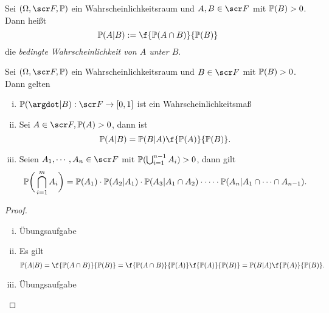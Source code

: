 \begin{df} \label{1.5.2}
	Sei $(\Omega, \scr F, \P)$ ein Wahrscheinlichkeitsraum und $A,B \in \scr F$ mit $\P(B) > 0$.
	Dann heißt
	\[
		\P(A | B) := \f {\P(A\cap B)}{\P(B)}
	\]
	die \emph{bedingte Wahrscheinlichkeit von $A$ unter $B$}.
\end{df}


\begin{st} \label{1.5.3}
	Sei $(\Omega, \scr F, \P)$ ein Wahrscheinlichkeitsraum und $B \in \scr F$ mit $\P(B) > 0$.
	Dann gelten
	\begin{enumerate}[(i)]
		\item
			$\P(\argdot | B) : \scr F \to [0,1]$ ist ein Wahrscheinlichkeitsmaß
		\item
			Sei $A \in \scr F, \P(A) > 0$, dann ist
			\[
				\P(A|B) = \P(B|A) \f {\P(A)}{\P(B)}.
			\]
		\item
			Seien $A_1, \cdots, A_n \in \scr F$ mit $\P(\bigcup_{i=1}^{n-1} A_i) > 0$, dann gilt
			\[
				\P\bigg(\bigcap_{i=1}^m A_i\bigg)
				= \P(A_1) \cdot \P(A_2|A_1) \cdot \P(A_3|A_1\cap A_2) \cdot \dotsb \cdot \P(A_n|A_1 \cap \dotsb \cap A_{n-1}).
			\]
	\end{enumerate}
	\begin{proof}
		\begin{enumerate}[(i)]
			\item
				Übungsaufgabe %
			\item
				Es gilt
				\[
					\P(A|B)
					= \f{\P(A\cap B)}{\P(B)}
					= \f{\P(A\cap B)}{\P(A)}\f{\P(A)}{\P(B)}
					= \P(B|A) \f{\P(A)}{\P(B)}.
				\]
			\item
				Übungsaufgabe %
		\end{enumerate}
	\end{proof}
\end{st}

